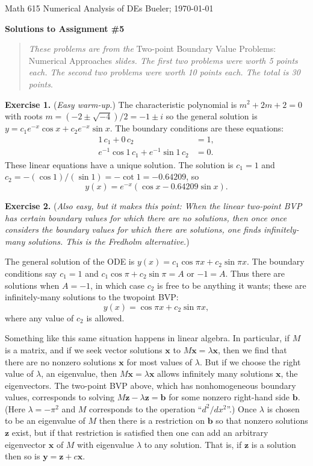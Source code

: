 \documentclass[11pt]{amsart}
\newcommand{\normalspacing}{\renewcommand{\baselinestretch}{1.05}
        \tiny\normalsize}
\newcommand{\bb}{\mathbf{b}}
\newcommand{\bx}{\mathbf{x}}
\newcommand{\by}{\mathbf{y}}
\newcommand{\bz}{\mathbf{z}}
\newcommand{\prob}[1]{\bigskip\noindent\textbf{#1.} }
\begin{document}
\scriptsize \noindent Math 615 Numerical Analysis of DEs \hfill Bueler; \today
\bigskip

\Large\centerline{\textbf{Solutions to Assignment \#5}}
\medskip
\small
\begin{quote}
\emph{These problems are from the} Two-point Boundary Value Problems: Numerical Approaches \emph{slides.  The first two problems were worth 5 points each.  The second two problems were worth 10 points each.  The total is 30 points}.
\end{quote}
\normalsize
\medskip
\thispagestyle{empty}
\normalspacing

\prob{Exercise 1}  (\emph{Easy warm-up.})  The characteristic polynomial is $m^2+2m+2=0$ with roots $m=(-2\pm\sqrt{-4})/2 = -1 \pm i$ so the general solution is $y = c_1 e^{-x} \cos x + c_2 e^{-x} \sin x$.  The boundary conditions are these equations:
\begin{align*}
  1\, c_1+ 0\, c_2 &= 1, \\
  e^{-1}\cos 1\, c_1 + e^{-1} \sin 1\, c_2 &= 0.
\end{align*}
These linear equations have a unique solution.  The solution is $c_1 = 1$ and $c_2 = - (\cos 1)/(\sin 1) = - \cot 1 = - 0.64209$, so
	$$y(x) = e^{-x}\left(\cos x - 0.64209 \sin x\right).$$

\prob{Exercise 2}  (\emph{Also easy, but it makes this point:  When the linear two-point BVP has certain boundary values for which there are \emph{no} solutions, then once once considers the boundary values for which there \emph{are} solutions, one finds infinitely-many solutions.  This is the \emph{Fredholm alternative}.})

The general solution of the ODE is $y(x) = c_1 \cos \pi x + c_2 \sin \pi x$.  The boundary conditions say $c_1=1$ and $c_1 \cos \pi + c_2 \sin \pi = A$ or $- 1 = A$.  Thus there are solutions when $A=-1$, in which case $c_2$ is free to be anything it wants; these are infinitely-many solutions to the twopoint BVP:
	$$y(x) = \cos\pi x + c_2 \sin \pi x,$$
where any value of $c_2$ is allowed.

Something like this same situation happens in linear algebra.  In particular, if $M$ is a matrix, and if we seek vector solutions $\bx$ to $M \bx = \lambda \bx$, then we find that there are no nonzero solutions $\bx$ for most values of $\lambda$.  But if we choose the right value of $\lambda$, an eigenvalue, then $M\bx = \lambda \bx$ allows infinitely many solutions $\bx$, the eigenvectors.  The two-point BVP above, which has nonhomogeneous boundary values,  corresponds to solving $M\bz - \lambda \bz = \bb$ for some nonzero right-hand side $\bb$.  (Here $\lambda = -\pi^2$ and $M$ corresponds to the operation ``$d^2/dx^2$''.)  Once $\lambda$ is chosen to be an eigenvalue of $M$ then there is a restriction on $\bb$ so that nonzero solutions $\bz$ exist, but if that restriction is satisfied then one can add an arbitrary eigenvector $\bx$ of $M$ with eigenvalue $\lambda$ to any solution.  That is, if $\bz$ is a solution then so is $\by = \bz + c \bx$.
\end{document}
